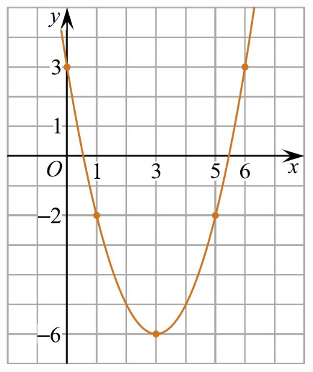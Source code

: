 \begin{listofex}
\begin{minipage}[c]{0.3\textwidth}
		\includegraphics[align=t, width=\textwidth]{pics/G113M3C7-1}
	\end{minipage}
\end{listofex}
%	
%	
